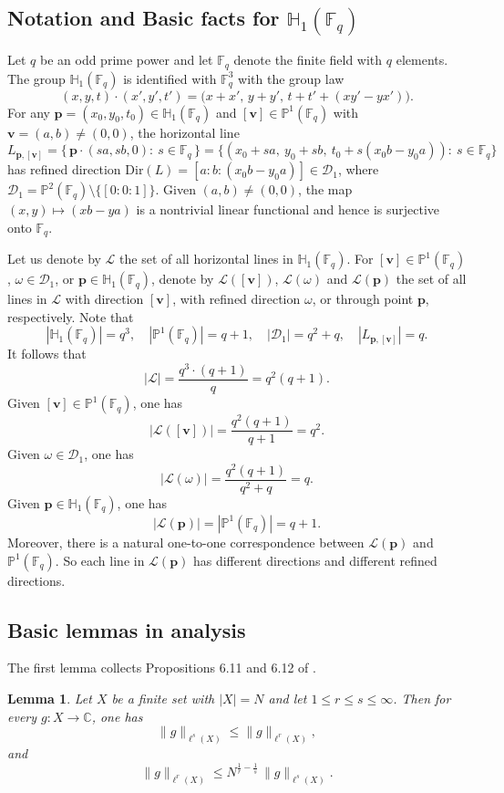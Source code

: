 \documentclass[11pt]{article}
\newtheorem{lemma}[theorem]{Lemma}
\newcommand{\PP}{\mathbb{P}}
\newcommand{\HH}{\mathbb{H}}
\newcommand{\cD}{\mathcal{D}}
\newcommand{\cL}{\mathcal{L}}
\newcommand{\1}{\mathbf 1}
\newcommand{\Fq}{\mathbb{F}_q}
\newcommand{\bfp}{\mathbf{p}}
\newcommand{\bfv}{\mathbf{v}}
\begin{document}
\subsection{Notation and Basic facts for $\mathbb H_1(\Fq)$}


Let $q$ be an odd prime power and let $\Fq$ denote the finite field with $q$ elements. The group $\mathbb{H}_1(\mathbb{F}_q)$ is identified with $\Fq^3$ with the group law
\[
(x, y, t)\cdot(x', y', t')
=
\bigl(x+x',\,y+ y',\,
t+t'+(xy'-yx')\bigr).
\]
For any $\bfp=(x_0,y_0,t_0)\in \HH_1(\Fq)$ and $[\bfv]\in \PP^1(\Fq)$ with $\bfv=(a,b)\neq (0,0)$, the horizontal line  
\[
L_{\mathbf{p}, [\mathbf{v}]}=\{\,\mathbf{p} \cdot(sa,sb,0):\ s\in \mathbb{F}_q\,\}=
\bigl\{(x_0+sa,\ y_0+sb,\
t_0+ s(x_0 b-y_0a)):\ s\in \mathbb{F}_q\bigr\}
\]
has refined direction $\mathrm{Dir}(L)=[a:b:(x_0b-y_0a)]\in \cD_1$, where $\cD_1=\PP^2(\Fq)\setminus\{[0:0:1]\}$. Given $(a,b)\neq (0,0)$, the map $(x,y)\mapsto (xb-ya)$ is a nontrivial linear functional and hence is surjective onto $\Fq$. 

Let us denote by $\cL$ the set of all horizontal lines in $\HH_1(\Fq)$. For $[\bfv] \in \PP^1(\Fq)$, $\omega\in \cD_1$, or $\bfp\in \HH_1(\Fq)$, denote by $\cL([\bfv])$, $\cL(\omega)$ and $\cL(\bfp)$ the set of all lines in $\cL$ with direction $[\bfv]$, with refined direction $\omega$, or through point $\bfp$, respectively. Note that
\[
|\HH_1(\Fq)|=q^3,\quad |\PP^1(\Fq)|=q+1,\quad |\cD_1|=q^2+q,\quad |L_{\bfp,[\bfv]}|=q.
\]
It follows that 
\[
|\cL|=\frac{q^3\cdot (q+1)}{q}=q^2(q+1).
\]
Given $[\bfv]\in \mathbb P^1(\Fq)$, one has \[
|\cL([\bfv])|=\frac{q^2(q+1)}{q+1}=q^2. 
\]
Given $\omega\in \cD_1$, one has 
\[
|\cL(\omega)|=\frac{q^2(q+1)}{q^2+q}=q.
\]
Given $\bfp\in \HH_1(\Fq)$, one has
\[
|\cL(\bfp)| = |\mathbb{P}^1(\mathbb{F}_q)|=q+1.
\]
Moreover, there is a natural one-to-one correspondence between $\cL(\bfp)$ and $\PP^1(\Fq)$. So each line in $\cL(\bfp)$ has different directions and different refined directions. 

\subsection{Basic lemmas in analysis}

The first lemma collects Propositions 6.11 and 6.12 of \cite{Fol}.

\begin{lemma} \label{lem:embed}
Let $X$ be a finite set with $|X|=N$ and let $1\le r\le s\le\infty$. Then for every $g:X\to\mathbb{C}$, one has 
\[
\|g\|_{\ell^s(X)}\le \|g\|_{\ell^r(X)},
\]
and 
\[
\|g\|_{\ell^r(X)} \le N^{\frac1r-\frac1s}\,\|g\|_{\ell^s(X)}.
\]
\end{lemma}
\end{document}
